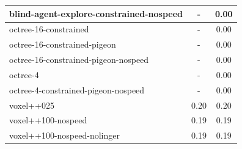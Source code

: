 \begin{longtable}{|l|c|c|}
blind-agent-explore-constrained-nospeed             & -         & {\cellcolor[HTML]{EBF2F0}} \color[HTML]{000000} 0.00       \\ \hline
octree-16-constrained                     & -                                                         & {\cellcolor[HTML]{EBF2F0}} \color[HTML]{000000} 0.00        \\ \hline
octree-16-constrained-pigeon                    & -                                                         & {\cellcolor[HTML]{EBF2F0}} \color[HTML]{000000} 0.00      \\ \hline
octree-16-constrained-pigeon-nospeed                   & -                                                         & {\cellcolor[HTML]{EBF2F0}} \color[HTML]{000000} 0.00       \\ \hline
octree-4                  & -                                                         & {\cellcolor[HTML]{EBF2F0}} \color[HTML]{000000} 0.00      \\ \hline
octree-4-constrained-pigeon-nospeed                  & -                                                         & {\cellcolor[HTML]{EBF2F0}} \color[HTML]{000000} 0.00     \\ \hline


voxel++025                              & {\cellcolor[HTML]{D2E6E2}} \color[HTML]{000000} 0.20   & {\cellcolor[HTML]{D2E6E2}} \color[HTML]{000000} 0.20        \\ \hline
voxel++100-nospeed                      & {\cellcolor[HTML]{D9EAE6}} \color[HTML]{000000} 0.19   & {\cellcolor[HTML]{D9EAE6}} \color[HTML]{000000} 0.19       \\ \hline
voxel++100-nospeed-nolinger             & {\cellcolor[HTML]{D9EAE6}} \color[HTML]{000000} 0.19   & {\cellcolor[HTML]{D9EAE6}} \color[HTML]{000000} 0.19        \\ \hline


\end{longtable}
